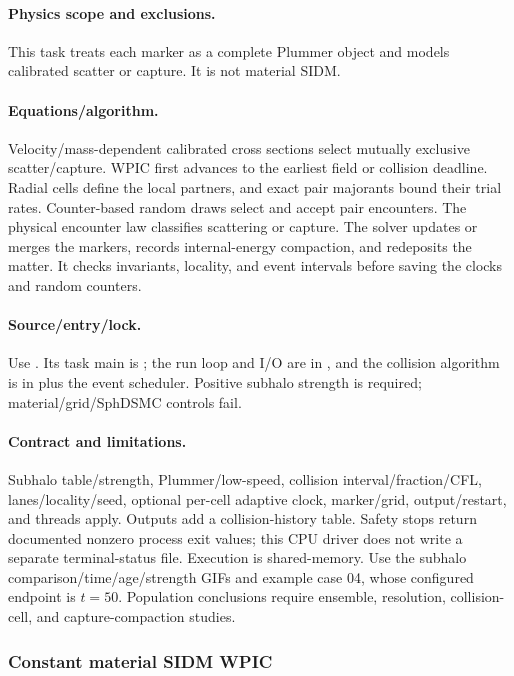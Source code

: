 \paragraph{Physics scope and exclusions.}
This task treats each marker as a complete Plummer object
and models calibrated scatter or capture.  It is not material SIDM.
\paragraph{Equations/algorithm.}
Velocity/mass-dependent calibrated cross sections select mutually exclusive
scatter/capture.  WPIC first advances to the earliest field or collision deadline. Radial
cells define the local partners, and exact pair majorants bound their trial
rates. Counter-based random draws select and accept pair encounters. The physical
encounter law classifies scattering or capture. The solver
updates or merges the markers, records internal-energy compaction, and
redeposits the matter. It checks invariants, locality, and event intervals
before saving the clocks and random counters.
\paragraph{Source/entry/lock.}
Use .  Its task main is
; the run loop and I/O are in
, and the collision algorithm is in
 plus the event scheduler.
Positive subhalo strength is required; material/grid/SphDSMC controls fail.
\paragraph{Contract and limitations.}
Subhalo table/strength, Plummer/low-speed, collision interval/fraction/CFL,
lanes/locality/seed, optional per-cell adaptive clock, marker/grid,
output/restart, and threads apply.  Outputs add a collision-history table.
Safety stops return documented nonzero process exit values; this CPU driver
does not write a separate terminal-status file.  Execution is shared-memory.
Use the subhalo comparison/time/age/strength GIFs and example case 04, whose
configured endpoint is \(t=50\).  Population conclusions require ensemble,
resolution, collision-cell, and capture-compaction studies.

\subsubsection{Constant material SIDM WPIC}
